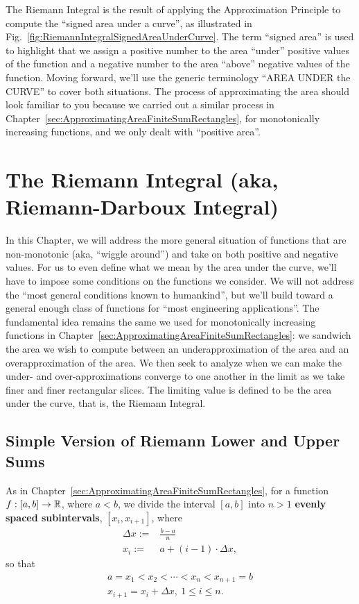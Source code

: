 The Riemann Integral is the result of applying the Approximation Principle to compute the ``signed area under a curve'', as illustrated in Fig.~\ref{fig:RiemannIntegralSignedAreaUnderCurve}. The term ``signed area'' is used to highlight that we assign a positive number to the area ``under'' positive values of the function and a negative number to the area ``above'' negative values of the function. Moving forward, we'll use the generic terminology ``AREA UNDER the CURVE'' to cover both situations. The process of approximating the area should look familiar to you because we carried out a similar process in Chapter~\ref{sec:ApproximatingAreaFiniteSumRectangles}, for monotonically increasing functions, and we only dealt with ``positive area''.

\section{The Riemann Integral (aka, Riemann-Darboux Integral)}

 In this Chapter, we will address the more general situation of functions that are non-monotonic (aka, ``wiggle around'') and take on both positive and negative values. For us to even define what we mean by the area under the curve, we'll have to impose some conditions on the functions we consider. We will not address the ``most general conditions known to humankind'', but we'll build toward a general enough class of functions for ``most engineering applications''. The fundamental idea remains the same we used for monotonically increasing functions in Chapter~\ref{sec:ApproximatingAreaFiniteSumRectangles}: we sandwich the area we wish to compute between an underapproximation of the area and an overapproximation of the area. We then seek to analyze when we can make the under- and over-approximations converge to one another in the limit as we take finer and finer rectangular slices. The limiting value is defined to be the area under the curve, that is, the Riemann Integral.

\subsection{Simple Version of Riemann Lower and Upper Sums}
\label{sec:SimpleRiemannLowerUpperSums}

As in Chapter~\ref{sec:ApproximatingAreaFiniteSumRectangles}, for a function $f:[a, b] \to \mathbb R$, where $a < b$, we divide the interval $[a, b]$ into $n >1$ \textbf{evenly spaced subintervals}, $[x_i, x_{i+1}]$, where
\begin{equation}
    \begin{aligned}
        \Delta x :=& \frac{b-a}{n} \\
           x_i :=& a + (i-1) \cdot \Delta x,
    \end{aligned}
\end{equation}
so that 
    \begin{gather}
        a = x_1 < x_2 < \cdots < x_{n} < x_{n+1} = b\\
        x_{i+1} = x_i + \Delta x, ~1 \le i \le n. 
    \end{gather}

